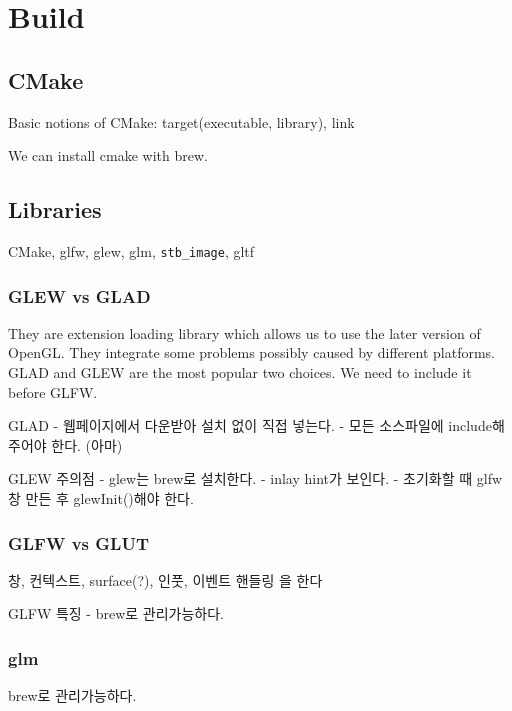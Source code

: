 \documentclass[a4paper]{report}
\title{}
\begin{document}
\maketitle

\chapter{Build}


\section{CMake}
Basic notions of CMake: target(executable, library), link

We can install cmake with brew.



\section{Libraries}

CMake, glfw, glew, glm, \verb|stb_image|, gltf




\subsection{GLEW vs GLAD}

They are extension loading library which allows us to use the later version of OpenGL.
They integrate some problems possibly caused by different platforms.
GLAD and GLEW are the most popular two choices.
We need to include it before GLFW.


GLAD
- 웹페이지에서 다운받아 설치 없이 직접 넣는다.
- 모든 소스파일에 include해주어야 한다. (아마)

GLEW 주의점
- glew는 brew로 설치한다.
- inlay hint가 보인다.
- 초기화할 때 glfw창 만든 후 glewInit()해야 한다.

\subsection{GLFW vs GLUT}
창, 컨텍스트, surface(?), 인풋, 이벤트 핸들링
을 한다

GLFW 특징
- brew로 관리가능하다.



\subsection{glm}
brew로 관리가능하다.
\end{document}
